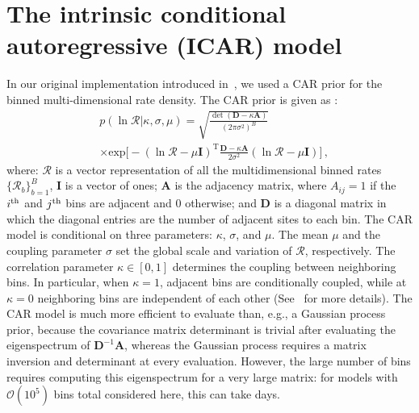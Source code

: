 \documentclass[twocolumn, twocolappendix]{aastex631}
\begin{document}
\section{The intrinsic conditional autoregressive (ICAR) model}
\label{sec:appICAR}

In our original implementation introduced in~\citet{Heinzel:2024jlc}, we used a \ac{CAR} prior for the binned multi-dimensional rate density. The \ac{CAR} prior is given as \citep{Besag:1974abc, Besag:1995car}:
\begin{align}
& p ( \ln\boldsymbol{\mathcal{R}} | \kappa , \sigma , \mu )
=
\sqrt{
\frac
{ \det ( \mathbf{D} - \kappa \mathbf{A} ) }
{ (2\pi \sigma^2 )^B }
}
\nonumber \\
& \times
\mathrm{exp}
\bigg[
- ( \ln\boldsymbol{\mathcal{R}} - \mu \mathbf{I} )^\mathrm{T}
\frac { \mathbf{D} - \kappa \mathbf{A} } { 2 \sigma^2 }
( \ln\boldsymbol{\mathcal{R}} - \mu \mathbf{I} )
\bigg]
\, ,
\label{eq: car prior}
\end{align}
where: $\boldsymbol{\mathcal{R}}$ is a vector representation of all the multidimensional binned rates $\{\mathcal{R}_b\}_{b=1}^B$, $\mathbf{I}$ is a vector of ones; $\mathbf{A}$ is the adjacency matrix, where $A_{ij} = 1$ if the $i^{\rm th}$ and $j^{\rm th}$ bins are adjacent and 0 otherwise; and $\mathbf{D}$ is a diagonal matrix in which the diagonal entries are the number of adjacent sites to each bin.
The \ac{CAR} model is conditional on three parameters: $\kappa$, $\sigma$, and $\mu$. The mean $\mu$ and the coupling parameter $\sigma$ set the global scale and variation of $\boldsymbol{\mathcal{R}}$, respectively. The correlation parameter $\kappa \in [0,1]$ determines the coupling between neighboring bins. In particular, when $\kappa=1$, adjacent bins are conditionally coupled, while at $\kappa=0$ neighboring bins are independent of each other (See~\citet{Heinzel:2024jlc} for more details). The CAR model is much more efficient to evaluate than, e.g., a Gaussian process prior, because the covariance matrix determinant is trivial after evaluating the eigenspectrum of $\mathbf{D}^{-1}\mathbf{A}$, whereas the Gaussian process requires a matrix inversion and determinant at every evaluation. However, the large number of bins requires computing this eigenspectrum for a very large matrix: for models with $\mathcal{O}(10^5)$ bins total considered here, this can take days.
\end{document}
